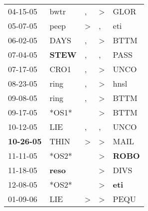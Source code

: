 \begin{supertabular}{p{0.07\textwidth}p{0.06\textwidth}p{0.02\textwidth}p{0.02\textwidth}p{0.06\textwidth}}
          04-15-05\textsuperscript{} &           bwtr\textsuperscript{} &                , &     \textgreater &           GLOR\textsuperscript{} \\
          05-07-05\textsuperscript{} &           peep\textsuperscript{} &     \textgreater &                , &            eti\textsuperscript{} \\
          06-02-05\textsuperscript{} &           DAYS\textsuperscript{} &                , &     \textgreater &           BTTM\textsuperscript{} \\
          07-04-05\textsuperscript{} &  \textbf{STEW\textsuperscript{}} &                , &                , &           PASS\textsuperscript{} \\
          07-17-05\textsuperscript{} &           CRO1\textsuperscript{} &                , &     \textgreater &           UNCO\textsuperscript{} \\
          08-23-05\textsuperscript{} &           ring\textsuperscript{} &                , &     \textgreater &           hnsl\textsuperscript{} \\
          09-08-05\textsuperscript{} &           ring\textsuperscript{} &                , &     \textgreater &           BTTM\textsuperscript{} \\
          09-17-05\textsuperscript{} &                            *OS1* &                  &     \textgreater &           BTTM\textsuperscript{} \\
          10-12-05\textsuperscript{} &            LIE\textsuperscript{} &                , &                , &           UNCO\textsuperscript{} \\
 \textbf{10-26-05\textsuperscript{}} &           THIN\textsuperscript{} &     \textgreater &     \textgreater &           MAIL\textsuperscript{} \\
          11-11-05\textsuperscript{} &                            *OS2* &                  &     \textgreater &  \textbf{ROBO\textsuperscript{}} \\
          11-18-05\textsuperscript{} &  \textbf{reso\textsuperscript{}} &                  &     \textgreater &           DIVS\textsuperscript{} \\
          12-08-05\textsuperscript{} &                            *OS2* &                  &     \textgreater &   \textbf{eti\textsuperscript{}} \\
          01-09-06\textsuperscript{} &            LIE\textsuperscript{} &     \textgreater &     \textgreater &           PEQU\textsuperscript{} \\

\end{supertabular}
